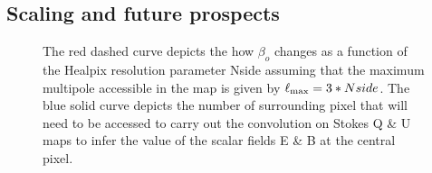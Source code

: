 \subsection{Scaling and future prospects}
%
\begin{figure}[!h] 
\centering
{}
\caption{The red dashed curve depicts the how $\beta_o$ changes as a function of the Healpix resolution parameter Nside assuming that the maximum multipole accessible in the map is given by $\ell_{\rm max} = 3 * Nside$. The blue solid curve depicts the number of surrounding pixel that will need to be accessed to carry out the convolution on Stokes Q \& U maps to infer the value of the scalar fields E \& B at the central pixel.}
\label{fig:disc_rad_healpix_numpix}
\end{figure}
%
